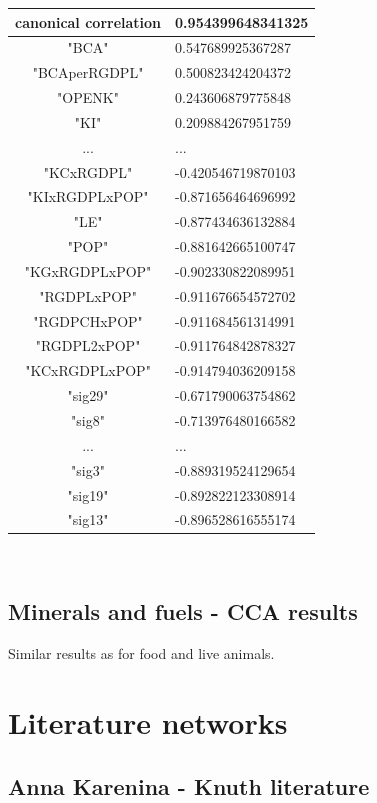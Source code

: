 \documentclass[11pt,a4paper,oneside]{report}
\begin{document}
\begin{tabular}{ c | l }
canonical correlation &  0.954399648341325\\
\hline
"BCA" & 0.547689925367287\\
"BCAperRGDPL" & 0.500823424204372\\
"OPENK" & 0.243606879775848\\
"KI" & 0.209884267951759\\
... & ...\\
"KCxRGDPL" & -0.420546719870103\\
"KIxRGDPLxPOP" & -0.871656464696992\\
"LE" & -0.877434636132884\\
"POP" & -0.881642665100747\\
"KGxRGDPLxPOP" & -0.902330822089951\\
"RGDPLxPOP" & -0.911676654572702\\
"RGDPCHxPOP" & -0.911684561314991\\
"RGDPL2xPOP" & -0.911764842878327\\
"KCxRGDPLxPOP" & -0.914794036209158\\
\hline
"sig29"  & -0.671790063754862\\
"sig8" & -0.713976480166582\\
... & ...\\
"sig3" & -0.889319524129654\\
"sig19" & -0.892822123308914\\
"sig13" & -0.896528616555174\\
\end{tabular}\\


\subsection*{Minerals and fuels - CCA results}

Similar results as for food and live animals.


\section*{Literature networks}

\subsection*{Anna Karenina - Knuth literature}
\end{document}
